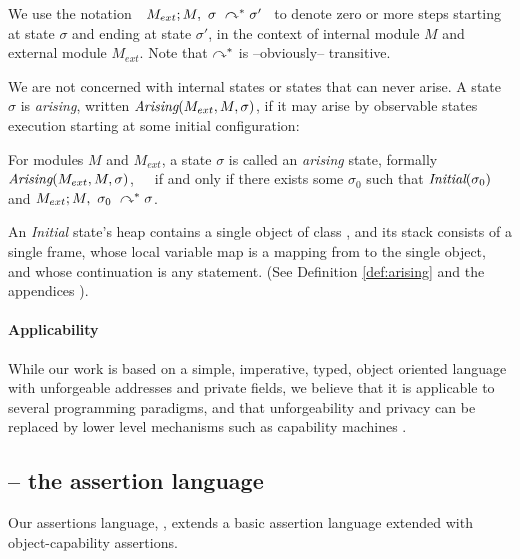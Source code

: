 We  use the notation\ \  $M_{ext} ; M,\ \sigma\ \curvearrowright^* \sigma'$ \ 
to denote zero or more  steps starting at state $\sigma$ and ending at state $\sigma'$, in the context of internal module 
$M$ and external module $M_{ext}$.
 Note that $\curvearrowright^*$ is --obviously-- transitive.
 
We are {not} concerned with internal states or states that can never arise.
{A state $\sigma$ is \emph{arising},}  written $\textit{Arising}(M_{ext}, M, \sigma)$, {if it  may arise by observable states} execution
starting at some initial configuration:



\begin{definition}
\label{def:arising}
For   modules $M$ and  $M_{ext}$, a %
 state $\sigma$ is 
called an \emph{arising} state, formally \ \ \ $\textit{Arising}(M_{ext}, M, \sigma)$,\ \ \ 
if and only if there exists some $\sigma_0$ such that $\textit{Initial}(\sigma_0)$ and
$M_{ext} ; M,\ \sigma_0\ \curvearrowright^* \sigma$.
\end{definition}

An \emph{Initial} state's heap
contains a single object of class , and
its  stack   consists of a single frame, whose local variable map is a
mapping from \prg{this} to the single object, and whose continuation is  any statement.
(See Definition %
\ref{def:arising} and the 
{appendices %
\cite{necessityFull}).}


\paragraph{Applicability} 
{While our work is based on 
  a simple, imperative, typed, object oriented}
language with unforgeable addresses and private fields, we believe
 that %
 it is applicable to several programming paradigms, and 
 that   unforgeability and privacy
 can be replaced 
 by lower level mechanisms such as capability machines \cite{vanproving,davis2019cheriabi}.

\subsection{\AssertLang -- the assertion language}
\label{sub:SpecO}

Our assertions language, \AssertLang, extends a 
 basic assertion language extended with
object-capability assertions. 



